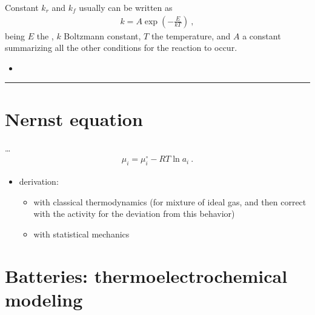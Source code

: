 \documentclass[letterpaper,10pt,english]{jupyterBook}
\begin{document}
\sphinxAtStartPar
Constant \(k_r\) and \(k_f\) usually can be written as
\begin{equation*}
\begin{split}k = A \exp \left( - \frac{E}{kT} \right) \ ,\end{split}
\end{equation*}
\sphinxAtStartPar
being \(E\) the , \(k\) Boltzmann constant, \(T\) the temperature, and \(A\) a constant summarizing all the other conditions for the reaction to occur.

\sphinxAtStartPar
{}
\begin{itemize}
\item {} 
\sphinxAtStartPar
{}

\end{itemize}


\bigskip\hrule\bigskip


\sphinxstepscope


\chapter{Nernst equation}
\label{\detokenize{ch/nernst-equation:nernst-equation}}\label{\detokenize{ch/nernst-equation:electro-chemical-nernst-equation}}\label{\detokenize{ch/nernst-equation::doc}}
\sphinxAtStartPar
…
\begin{equation*}
\begin{split}\mu_i = \mu_i^\circ - RT \ln a_i \ .\end{split}
\end{equation*}
\sphinxAtStartPar
{}
\begin{itemize}
\item {} 
\sphinxAtStartPar
derivation:
\begin{itemize}
\item {} 
\sphinxAtStartPar
with classical thermodynamics (for mixture of ideal gas, and then correct with the activity for the deviation from this behavior)

\item {} 
\sphinxAtStartPar
with statistical mechanics

\end{itemize}

\end{itemize}

\sphinxstepscope


\chapter{Batteries: thermo\sphinxhyphen{}electro\sphinxhyphen{}chemical modeling}
\label{\detokenize{ch/batteries:batteries-thermo-electro-chemical-modeling}}\label{\detokenize{ch/batteries:electro-chemical-batteries}}\label{\detokenize{ch/batteries::doc}}
\end{document}
